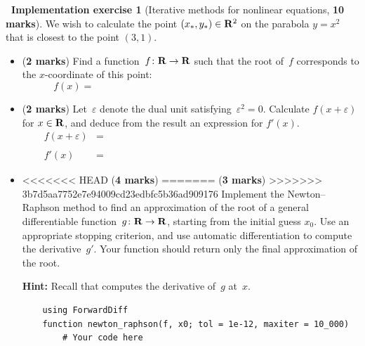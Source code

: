 \documentclass[10pt]{article}
\theoremstyle{definition}
\newtheorem{compexercise}{{\normalfont \faLaptop}~Implementation exercise}
\renewcommand{\mymarks}[1]{\textbf{#1 marks}}
\begin{document}
\newpage
\begin{compexercise}
    [Iterative methods for nonlinear equations, \mymarks{10}]
    We wish to calculate the point $(x_*, y_*) \in \mathbf R^2$ on the parabola $y = x^2$ that is closest to the point $(3, 1)$.
    \begin{itemize}
        \item
            (\mymarks{2})
            Find a function~$f \colon \mathbf R \to \mathbf R$ such that the root of~$f$ corresponds to the $x$-coordinate of this point:
            \[
                f(x) = \hspace{10cm}
            \]

        \item
            (\mymarks{2})
            Let~$\varepsilon$ denote the dual unit satisfying~$\varepsilon^2 = 0$.
            Calculate $f(x + \varepsilon)$ for $x \in \mathbf R$,
            and deduce from the result an expression for $f'(x)$.
            \begin{align*}
                f(x + \varepsilon) &= \hspace{10cm} \\
                \\
                f'(x) &= \hspace{10cm}
            \end{align*}

        \item
<<<<<<< HEAD
            (\mymarks{4})
=======
            (\mymarks{3})
>>>>>>> 3b7d5aa7752e7e94009cd23edbfc5b36ad909176
            Implement the Newton--Raphson method to find an approximation of the root of a general differentiable function~$g \colon \mathbf R \to \mathbf R$,
            starting from the initial guess $x_0$.
            Use an appropriate stopping criterion, and use automatic differentiation to compute the derivative~$g'$.
            Your function should return only the final approximation of the root.

            \textbf{Hint:}
            Recall that  computes the derivative of~$g$ at~$x$.
            \begin{verbatim}
    using ForwardDiff
    function newton_raphson(f, x0; tol = 1e-12, maxiter = 10_000)
        # Your code here


















\end{verbatim}
\end{itemize}
\end{compexercise}
\end{document}
